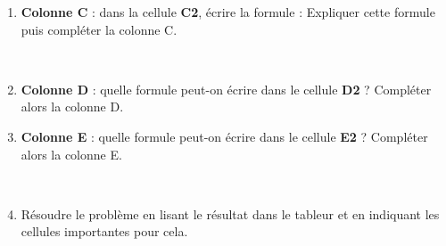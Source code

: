 \begin{enigme}[Le tableur]
\begin{enumerate}
        \pointilles \medskip
      \item {\bf Colonne C} : dans la cellule {\bf C2}, écrire la formule :  Expliquer cette formule puis compléter la colonne C. \par\
        \pointilles \medskip
      \item {\bf Colonne D} : quelle formule peut-on écrire dans le cellule \textbf{D2} ? Compléter alors la colonne D. \par
        \pointilles \medskip
      \item {\bf Colonne E} : quelle formule peut-on écrire dans le cellule \textbf{E2} ? Compléter alors la colonne E. \par\
        \pointilles \medskip
      \item Résoudre le problème en lisant le résultat dans le tableur et en indiquant les cellules importantes pour cela. \par
        \pointilles
   \end{enumerate}
\end{enigme}

